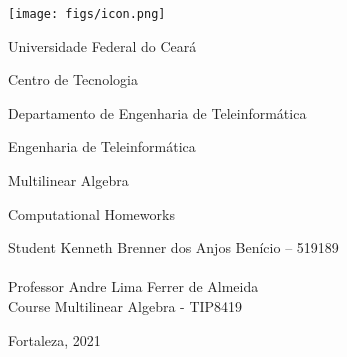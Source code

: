 \thispagestyle{empty}

\begin{center}
  
    \texttt{[image: figs/icon.png]}
    
    \LARGE{Universidade Federal do Ceará}
    
    \LARGE{Centro de Tecnologia}
    
    \LARGE{Departamento de Engenharia de Teleinformática}
    
    \LARGE{Engenharia de Teleinformática}
    
    \vspace{180pt}
      
    \LARGE{Multilinear Algebra}
      
    \LARGE{Computational Homeworks}
      
    \vspace{100pt}
    
\end{center}

\vspace{25pt}

\begin{flushleft}
	\begin{tabbing}
		Student \qquad Kenneth Brenner dos Anjos Benício – 519189\\
	   \qquad\qquad\qquad\= \\
		Professor\> Andre Lima Ferrer de Almeida \\
		Course \> Multilinear Algebra - TIP8419\\
	\end{tabbing}
\end{flushleft}

\vspace{25pt}

\begin{center}
    Fortaleza, 2021
\end{center}